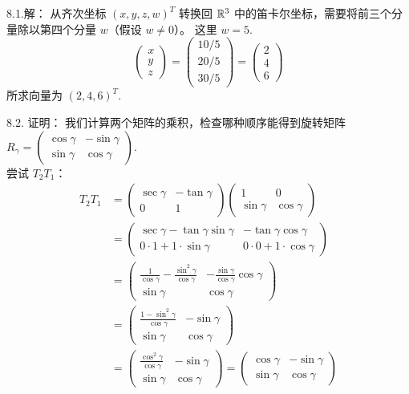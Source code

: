 \begin{exer}
8.1.解：
从齐次坐标 $(x, y, z, w)^T$ 转换回 $\mathbb{R}^3$ 中的笛卡尔坐标，需要将前三个分量除以第四个分量 $w$（假设 $w \neq 0$）。
这里 $w = 5$.~
$$
\begin{pmatrix} x \\ y \\ z \end{pmatrix} = \begin{pmatrix} 10/5 \\ 20/5 \\ 30/5 \end{pmatrix} = \begin{pmatrix} 2 \\ 4 \\ 6 \end{pmatrix}
$$
所求向量为 $(2, 4, 6)^T$.~

8.2. 证明：
我们计算两个矩阵的乘积，检查哪种顺序能得到旋转矩阵 $R_\gamma = \begin{pmatrix} \cos\gamma & -\sin\gamma \\ \sin\gamma & \cos\gamma \end{pmatrix}$.~
\\
尝试 $T_2 T_1$：
$$
\begin{aligned}
T_2 T_1 &= \begin{pmatrix} \sec \gamma & -\tan \gamma \\ 0 & 1 \end{pmatrix} \begin{pmatrix} 1 & 0 \\ \sin \gamma & \cos \gamma \end{pmatrix} \\
&= \begin{pmatrix} \sec\gamma - \tan\gamma\sin\gamma & -\tan\gamma\cos\gamma \\ 0\cdot 1 + 1\cdot\sin\gamma & 0\cdot 0 + 1\cdot\cos\gamma \end{pmatrix} \\
&= \begin{pmatrix} \frac{1}{\cos\gamma} - \frac{\sin^2\gamma}{\cos\gamma} & -\frac{\sin\gamma}{\cos\gamma}\cos\gamma \\ \sin\gamma & \cos\gamma \end{pmatrix} \\
&= \begin{pmatrix} \frac{1-\sin^2\gamma}{\cos\gamma} & -\sin\gamma \\ \sin\gamma & \cos\gamma \end{pmatrix} \\
&= \begin{pmatrix} \frac{\cos^2\gamma}{\cos\gamma} & -\sin\gamma \\ \sin\gamma & \cos\gamma \end{pmatrix} = \begin{pmatrix} \cos\gamma & -\sin\gamma \\ \sin\gamma & \cos\gamma \end{pmatrix}

\end{aligned}$$
\end{exer}
